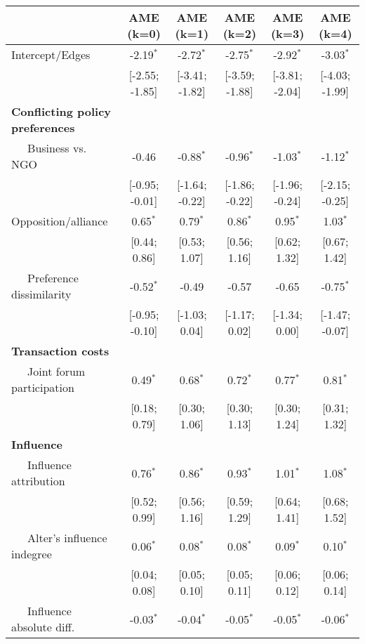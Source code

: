 \begin{table}[ht]
\centering
\begingroup\tiny
\begin{tabular}{lccccc}
   & AME (k=0) & AME (k=1) & AME (k=2) & AME (k=3) & AME (k=4) \\ 
  \hline
\hline
Intercept/Edges & -2.19$^{\ast}$ & -2.72$^{\ast}$ & -2.75$^{\ast}$ & -2.92$^{\ast}$ & -3.03$^{\ast}$ \\ 
   & [-2.55; -1.85] & [-3.41; -1.82] & [-3.59; -1.88] & [-3.81; -2.04] & [-4.03; -1.99] \\ 
  \textbf{Conflicting policy preferences} &  &  &  &  &  \\ 
  $\;\;\;\;$ Business vs. NGO & -0.46 & -0.88$^{\ast}$ & -0.96$^{\ast}$ & -1.03$^{\ast}$ & -1.12$^{\ast}$ \\ 
   & [-0.95; -0.01] & [-1.64; -0.22] & [-1.86; -0.22] & [-1.96; -0.24] & [-2.15; -0.25] \\ 
  $\;\;\;\;$ Opposition/alliance & 0.65$^{\ast}$ & 0.79$^{\ast}$ & 0.86$^{\ast}$ & 0.95$^{\ast}$ & 1.03$^{\ast}$ \\ 
   & [0.44; 0.86] & [0.53; 1.07] & [0.56; 1.16] & [0.62; 1.32] & [0.67; 1.42] \\ 
  $\;\;\;\;$ Preference dissimilarity & -0.52$^{\ast}$ & -0.49 & -0.57 & -0.65 & -0.75$^{\ast}$ \\ 
   & [-0.95; -0.10] & [-1.03; 0.04] & [-1.17; 0.02] & [-1.34; 0.00] & [-1.47; -0.07] \\ 
  \textbf{Transaction costs} &  &  &  &  &  \\ 
  $\;\;\;\;$ Joint forum participation & 0.49$^{\ast}$ & 0.68$^{\ast}$ & 0.72$^{\ast}$ & 0.77$^{\ast}$ & 0.81$^{\ast}$ \\ 
   & [0.18; 0.79] & [0.30; 1.06] & [0.30; 1.13] & [0.30; 1.24] & [0.31; 1.32] \\ 
  \textbf{Influence} &  &  &  &  &  \\ 
  $\;\;\;\;$ Influence attribution & 0.76$^{\ast}$ & 0.86$^{\ast}$ & 0.93$^{\ast}$ & 1.01$^{\ast}$ & 1.08$^{\ast}$ \\ 
   & [0.52; 0.99] & [0.56; 1.16] & [0.59; 1.29] & [0.64; 1.41] & [0.68; 1.52] \\ 
  $\;\;\;\;$ Alter's influence indegree & 0.06$^{\ast}$ & 0.08$^{\ast}$ & 0.08$^{\ast}$ & 0.09$^{\ast}$ & 0.10$^{\ast}$ \\ 
   & [0.04; 0.08] & [0.05; 0.10] & [0.05; 0.11] & [0.06; 0.12] & [0.06; 0.14] \\ 
  $\;\;\;\;$ Influence absolute diff. & -0.03$^{\ast}$ & -0.04$^{\ast}$ & -0.05$^{\ast}$ & -0.05$^{\ast}$ & -0.06$^{\ast}$ \\ 

\end{tabular}
\end{table}
